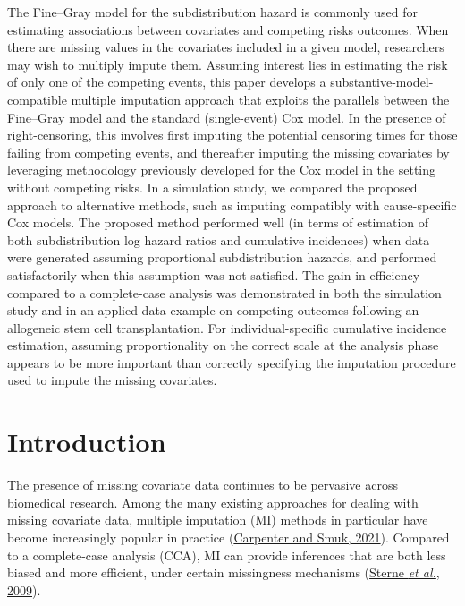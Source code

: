 \documentclass[
  letterpaper,
  DIV=11,
  numbers=noendperiod]{scrreprt}
\begin{document}
The Fine--Gray model for the subdistribution hazard is commonly used for
estimating associations between covariates and competing risks outcomes.
When there are missing values in the covariates included in a given
model, researchers may wish to multiply impute them. Assuming interest
lies in estimating the risk of only one of the competing events, this
paper develops a substantive-model-compatible multiple imputation
approach that exploits the parallels between the Fine--Gray model and
the standard (single-event) Cox model. In the presence of
right-censoring, this involves first imputing the potential censoring
times for those failing from competing events, and thereafter imputing
the missing covariates by leveraging methodology previously developed
for the Cox model in the setting without competing risks. In a
simulation study, we compared the proposed approach to alternative
methods, such as imputing compatibly with cause-specific Cox models. The
proposed method performed well (in terms of estimation of both
subdistribution log hazard ratios and cumulative incidences) when data
were generated assuming proportional subdistribution hazards, and
performed satisfactorily when this assumption was not satisfied. The
gain in efficiency compared to a complete-case analysis was demonstrated
in both the simulation study and in an applied data example on competing
outcomes following an allogeneic stem cell transplantation. For
individual-specific cumulative incidence estimation, assuming
proportionality on the correct scale at the analysis phase appears to be
more important than correctly specifying the imputation procedure used
to impute the missing covariates.

\hfill\break

\hypertarget{introduction-2}{%
\section{Introduction}\label{introduction-2}}

The presence of missing covariate data continues to be pervasive across
biomedical research. Among the many existing approaches for dealing with
missing covariate data, multiple imputation (MI) methods in particular
have become increasingly popular in practice
(\protect\hyperlink{ref-carpenterMissingDataStatistical2021}{Carpenter
and Smuk, 2021}). Compared to a complete-case analysis (CCA), MI can
provide inferences that are both less biased and more efficient, under
certain missingness mechanisms
(\protect\hyperlink{ref-sterneMultipleImputationMissing2009}{Sterne
\emph{et al.}, 2009}).
\end{document}
